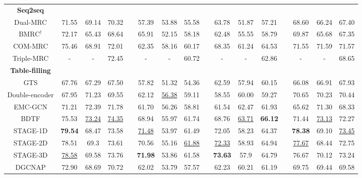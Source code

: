 \documentclass[11pt]{article}
\begin{document}
\begin{table}[ht]
{\begin{tabular}{cccccccccccccccc}
    \midrule
    \textbf{Seq2seq} &       &       &       &       &       &       &       &       &       &       &       &       &       &       &  \\
    Dual-MRC \textrm{\cite{mao2021joint}} & 71.55 & 69.14 & 70.32 &       & 57.39 & 53.88 & 55.58 &       & 63.78 & 51.87 & 57.21 &       & 68.60 & 66.24 & 67.40 \\
    $\textrm{BMRC}^\dagger$ \textrm{\cite{chen2021bidirectional}} & 72.17 & 65.43 & 68.64 &       & 65.91 & 52.15 & 58.18 &       & 62.48 & 55.55 & 58.79 &       & 69.87 & 65.68 & 67.35 \\
    COM-MRC \textrm{\cite{zhai2022mrc}} & 75.46 & 68.91 & 72.01 &       & 62.35 & 58.16 & 60.17 &       & 68.35 & 61.24 & 64.53 &       & 71.55 & 71.59 & 71.57 \\ 
    Triple-MRC \textrm{\cite{zou2024multi}} & - & - & 72.45 &       & - & - & 60.72 &       & - & - & 62.86 &       & - & - & 68.65 \\
    
    \midrule
    \textbf{Table-filling} &       &       &       &       &       &       &       &       &       &       &       &       &       &       &  \\
    GTS \textrm{\cite{wu2020grid}}   & 67.76 & 67.29 & 67.50 &       & 57.82 & 51.32 & 54.36 &       & 62.59 & 57.94 & 60.15 &       & 66.08 & 66.91 & 67.93 \\
    Double-encoder \textrm{\cite{jing2021seeking}} & 67.95 & 71.23 & 69.55 &       & 62.12 & \underline{56.38} & 59.11 &       & 58.55 & 60.00 & 59.27 &       & 70.65 & 70.23 & 70.44 \\
    EMC-GCN \textrm{\cite{chen2022enhanced}} & 71.21 & 72.39 & 71.78 &       & 61.70 & 56.26 & 58.81 &       & 61.54 & 62.47 & 61.93 &       & 65.62 & 71.30 & 68.33 \\

    BDTF \textrm{\cite{zhang2022boundary}} & 75.53 & \underline{73.24} & \underline{74.35} &       & 68.94 & 55.97 & 61.74 &       & 68.76 & \underline{63.71} & \textbf{66.12} &       & 71.44 & \underline{73.13} & 72.27 \\
    STAGE-1D \textrm{\cite{liang2023stage}} & \textbf{79.54} & 68.47 & 73.58 &       & \underline{71.48} & 53.97 & 61.49 &       & 72.05 & 58.23 & 64.37 &       & \textbf{78.38} & 69.10  & \underline{73.45} \\
    STAGE-2D \textrm{\cite{liang2023stage}} & 78.51 & 69.3  & 73.61 &       & 70.56 & 55.16 & \underline{61.88} &       & \underline{72.33} & 58.93 & 64.94 &       & \underline{77.67} & 68.44 & 72.75 \\
    STAGE-3D \textrm{\cite{liang2023stage}} & \underline{78.58} & 69.58 & 73.76 &       & \textbf{71.98} & 53.86 & 61.58 &       & \textbf{73.63} & 57.9  & 64.79 &       & 76.67 & 70.12 & 73.24 \\
    DGCNAP \textrm{\cite{li2023dual}} & 72.90 & 68.69 & 70.72 &       & 62.02 & 53.79 & 57.57 &       & 62.23 & 60.21  & 61.19 &       & 69.75 & 69.44 & 69.58 \\
    \midrule


\end{tabular}}
\end{table}
\end{document}
